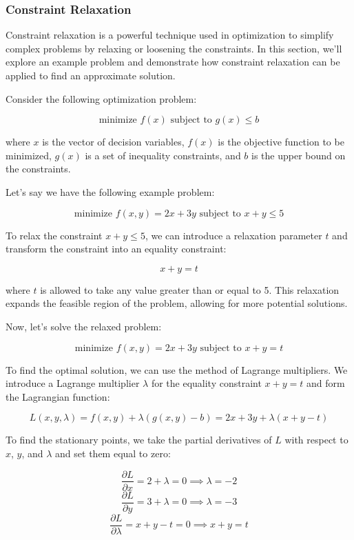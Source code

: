 \documentclass[12pt]{book} %
\begin{document}
\subsubsection{Constraint Relaxation}

Constraint relaxation is a powerful technique used in optimization to simplify complex problems by relaxing or loosening the constraints. In this section, we'll explore an example problem and demonstrate how constraint relaxation can be applied to find an approximate solution.

Consider the following optimization problem:

\[
\text{minimize } f(x) \text{ subject to } g(x) \leq b
\]

where \(x\) is the vector of decision variables, \(f(x)\) is the objective function to be minimized, \(g(x)\) is a set of inequality constraints, and \(b\) is the upper bound on the constraints.

Let's say we have the following example problem:

\[
\text{minimize } f(x, y) = 2x + 3y \text{ subject to } x + y \leq 5
\]

To relax the constraint \(x + y \leq 5\), we can introduce a relaxation parameter \(t\) and transform the constraint into an equality constraint:

\[
x + y = t
\]

where \(t\) is allowed to take any value greater than or equal to 5. This relaxation expands the feasible region of the problem, allowing for more potential solutions.

Now, let's solve the relaxed problem:

\[
\text{minimize } f(x, y) = 2x + 3y \text{ subject to } x + y = t
\]

To find the optimal solution, we can use the method of Lagrange multipliers. We introduce a Lagrange multiplier \(\lambda\) for the equality constraint \(x + y = t\) and form the Lagrangian function:

\[
L(x, y, \lambda) = f(x, y) + \lambda(g(x, y) - b) = 2x + 3y + \lambda(x + y - t)
\]

To find the stationary points, we take the partial derivatives of \(L\) with respect to \(x\), \(y\), and \(\lambda\) and set them equal to zero:

\[
\frac{\partial L}{\partial x} = 2 + \lambda = 0 \implies \lambda = -2
\]
\[
\frac{\partial L}{\partial y} = 3 + \lambda = 0 \implies \lambda = -3
\]
\[
\frac{\partial L}{\partial \lambda} = x + y - t = 0 \implies x + y = t
\]
\end{document}
